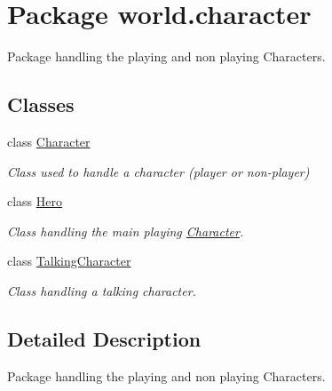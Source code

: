 \hypertarget{namespaceworld_1_1character}{\section{Package world.\-character}
\label{namespaceworld_1_1character}
}


Package handling the playing and non playing Characters.  


\subsection*{Classes}
\begin{DoxyCompactItemize}
\item 
class \hyperlink{classworld_1_1character_1_1_character}{Character}
\begin{DoxyCompactList}\small\item\em Class used to handle a character (player or non-\/player) \end{DoxyCompactList}\item 
class \hyperlink{classworld_1_1character_1_1_hero}{Hero}
\begin{DoxyCompactList}\small\item\em Class handling the main playing \hyperlink{classworld_1_1character_1_1_character}{Character}. \end{DoxyCompactList}\item 
class \hyperlink{classworld_1_1character_1_1_talking_character}{Talking\-Character}
\begin{DoxyCompactList}\small\item\em Class handling a talking character. \end{DoxyCompactList}\end{DoxyCompactItemize}


\subsection{Detailed Description}
Package handling the playing and non playing Characters. 